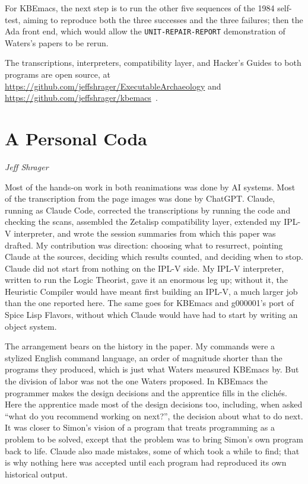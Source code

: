 \documentclass[11pt]{article}
\begin{document}
For KBEmacs, the next step is to run the other five sequences of the
1984 self-test, aiming to reproduce both the three successes and the
three failures; then the Ada front end, which would allow the
\texttt{UNIT-REPAIR-REPORT} demonstration of Waters's papers to be
rerun.

The transcriptions, interpreters, compatibility layer, and Hacker's
Guides to both programs are open source, at \url{https://github.com/jeffshrager/ExecutableArchaeology} and \url{https://github.com/jeffshrager/kbemacs}~\cite{earepo,kbemacsrepo}.

\section{A Personal Coda}

{\em Jeff Shrager}

Most of the hands-on work in both reanimations was done by AI systems.
Most of the transcription from the page images was done by ChatGPT.
Claude, running as Claude Code, corrected the transcriptions by running
the code and checking the scans, assembled the Zetalisp compatibility
layer, extended my IPL-V interpreter, and wrote the session summaries
from which this paper was drafted. My contribution was direction:
choosing what to resurrect, pointing Claude at the sources, deciding
which results counted, and deciding when to stop. Claude did not start
from nothing on the IPL-V side. My IPL-V interpreter, written to run the Logic Theorist,
gave it an enormous leg up; without it, the Heuristic Compiler would
have meant first building an IPL-V, a much larger job than the one
reported here. The same goes for KBEmacs and g000001's port of Spice
Lisp Flavors, without which Claude would have had to start by writing
an object system.

The arrangement bears on the history in the paper. My commands were a stylized English command language, an order of
magnitude shorter than the programs they produced, which is just what
Waters measured KBEmacs by. But the division of labor was not the one
Waters proposed. In KBEmacs the programmer makes the design decisions
and the apprentice fills in the clich\'es. Here the apprentice made most
of the design decisions too, including, when asked ``what do you
recommend working on next?'', the decision about what to do next. It
was closer to Simon's vision of a program that treats programming as a
problem to be solved, except that the problem was to bring Simon's own
program back to life. Claude also made mistakes, some of which took a
while to find; that is why nothing here was accepted until each program
had reproduced its own historical output.
\end{document}
